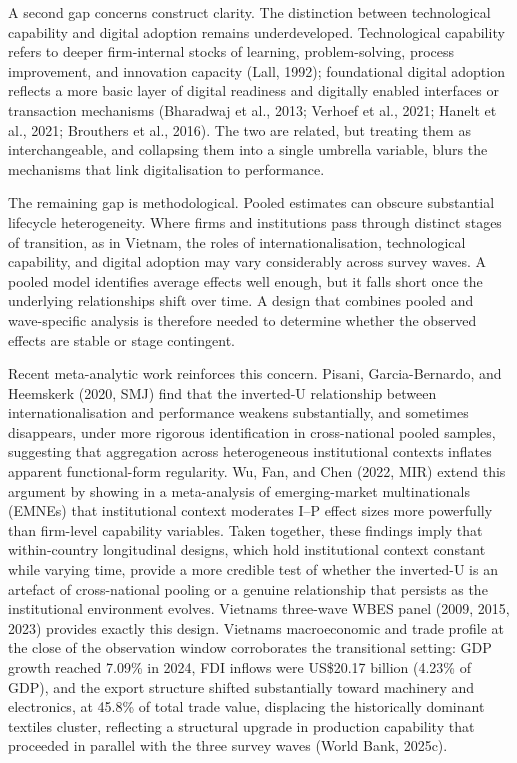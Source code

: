 \documentclass[12pt,a4paper]{article}
\begin{document}
A second gap concerns construct clarity. The distinction between
technological capability and digital adoption remains underdeveloped.
Technological capability refers to deeper firm-internal stocks of
learning, problem-solving, process improvement, and innovation capacity
(Lall, 1992); foundational digital adoption reflects a more basic layer
of digital readiness and digitally enabled interfaces or transaction
mechanisms (Bharadwaj et al., 2013; Verhoef et al., 2021; Hanelt et al.,
2021; Brouthers et al., 2016). The two are related, but treating them as
interchangeable, and collapsing them into a single umbrella variable,
blurs the mechanisms that link digitalisation to performance.

The remaining gap is methodological. Pooled estimates can obscure
substantial lifecycle heterogeneity. Where firms and institutions pass
through distinct stages of transition, as in Vietnam, the roles of
internationalisation, technological capability, and digital adoption may
vary considerably across survey waves. A pooled model identifies average
effects well enough, but it falls short once the underlying
relationships shift over time. A design that combines pooled and
wave-specific analysis is therefore needed to determine whether the
observed effects are stable or stage contingent.

Recent meta-analytic work reinforces this concern. Pisani,
Garcia-Bernardo, and Heemskerk (2020, SMJ) find that the inverted-U
relationship between internationalisation and performance weakens
substantially, and sometimes disappears, under more rigorous
identification in cross-national pooled samples, suggesting that
aggregation across heterogeneous institutional contexts inflates
apparent functional-form regularity. Wu, Fan, and Chen (2022, MIR)
extend this argument by showing in a meta-analysis of emerging-market
multinationals (EMNEs) that institutional context moderates I--P effect
sizes more powerfully than firm-level capability variables. Taken
together, these findings imply that within-country longitudinal designs,
which hold institutional context constant while varying time, provide a
more credible test of whether the inverted-U is an artefact of
cross-national pooling or a genuine relationship that persists as the
institutional environment evolves. Vietnam\textquotesingle s three-wave
WBES panel (2009, 2015, 2023) provides exactly this design.
Vietnam\textquotesingle s macroeconomic and trade profile at the close
of the observation window corroborates the transitional setting: GDP
growth reached 7.09\% in 2024, FDI inflows were US\$20.17 billion
(4.23\% of GDP), and the export structure shifted substantially toward
machinery and electronics, at 45.8\% of total trade value, displacing
the historically dominant textiles cluster, reflecting a structural
upgrade in production capability that proceeded in parallel with the
three survey waves (World Bank, 2025c).
\end{document}
